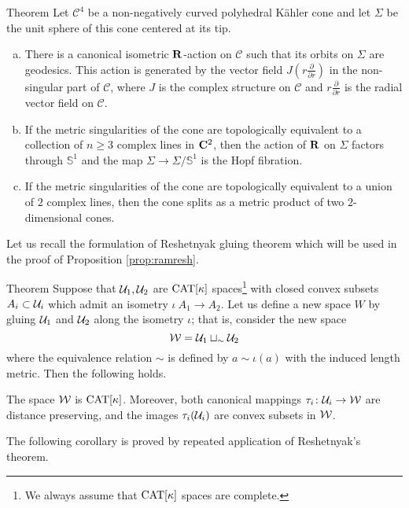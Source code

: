 \documentclass{compositio}
\begin{document}
\begin{thm}{Theorem}\label{allPK}
Let $\mathcal C^4$ be a non-negatively curved polyhedral K\"ahler cone and let $\Sigma$
be the unit sphere of this cone centered at its tip.

\begin{enumerate}[(a)]
\item There is a canonical isometric $\mathbf{R}$-action on $\mathcal C$
such that its orbits on $\Sigma$ are geodesics. This action is generated
by the vector field $J(r\frac{\partial}{\partial r})$ in the non-singular part
of $\mathcal C$, where $J$ is the complex structure on $\mathcal C$ and $r\frac{\partial}{\partial r}$
is the radial vector field on $\mathcal C$.
\item If the metric singularities of the cone are topologically equivalent to
a collection of $n\ge 3$ complex lines in $\mathbf{C}^2$, then the action
of $\mathbf{R}$ on $\Sigma$ factors through $\mathbb{S}^1$ and the map
$\Sigma\to \Sigma/\mathbb{S}^1$ is the Hopf fibration.
\item\label{allPK:3} If the metric singularities of the cone are topologically equivalent to
a union of $2$ complex lines, then the cone splits as a metric product
of two $2$-dimensional cones.
\end{enumerate}
\end{thm}

Let us recall the formulation of Reshetnyak gluing theorem which will be used in the proof of  Proposition \ref{prop:ramresh}.

\begin{thm}{Theorem}\label{thm:gluing}
Suppose that
$\mathcal{U}_1, \mathcal{U}_2$ are $\mathrm{CAT}[\kappa]$ spaces\footnote{We always assume that $\mathrm{CAT}[\kappa]$ spaces are complete.} with
closed convex subsets $A_i\subset\mathcal{U}_i$
which admit an isometry $\iota\:A_1\to A_2$.
Let us define a new space $W$ by gluing 
$\mathcal{U}_1$ and  $\mathcal{U}_2$ along the isometry $\iota$;
that is,  consider the new space
\[\mathcal{W}=\mathcal{U}_1\sqcup_\sim\mathcal{U}_2\]
where the equivalence relation $\sim$ is defined by $a\sim \iota(a)$ with the induced length metric. Then the following holds.

The space $\mathcal{W}$ is $\mathrm{CAT}[\kappa]$.
Moreover, both canonical mappings
$\tau_i\colon\mathcal{U}_i\to\mathcal{W}$ are distance preserving,
and the images $\tau_i(\mathcal{U}_i)$ are convex subsets in $\mathcal{W}$.
\end{thm}

The following corollary is proved by repeated application of Reshetnyak's theorem.
\end{document}
